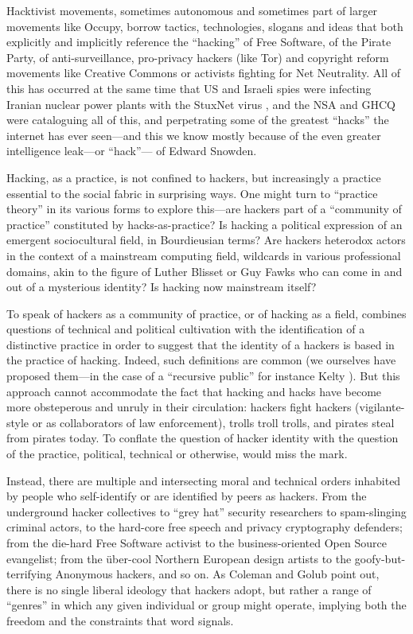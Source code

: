 \documentclass[10pt,letter,oneside]{scrartcl}
\begin{document}
Hacktivist movements, sometimes autonomous and sometimes part of larger
movements like Occupy, borrow tactics, technologies, slogans and ideas that both
explicitly and implicitly reference the ``hacking'' of Free Software, of the
Pirate Party, of anti-surveillance, pro-privacy hackers (like Tor) and copyright
reform movements like Creative Commons or activists fighting for Net
Neutrality. All of this has occurred at the same time that US and Israeli spies
were infecting Iranian nuclear power plants with the StuxNet virus
\parencite{zetter_countdown_2014}, and the NSA and GHCQ were cataloguing all of
this, and perpetrating some of the greatest ``hacks'' the internet has ever
seen---and this we know mostly because of the even greater intelligence
leak---or ``hack''--- of Edward Snowden.

Hacking, as a practice, is not confined to hackers, but increasingly a practice
essential to the social fabric in surprising ways.  One might turn to ``practice
theory'' in its various forms to explore this---are hackers part of a
``community of practice'' constituted by hacks-as-practice?  Is hacking a
political expression of an emergent sociocultural field, in Bourdieusian terms?
Are hackers heterodox actors in the context of a mainstream computing field,
wildcards in various professional domains, akin to the figure of Luther Blisset
or Guy Fawks who can come in and out of a mysterious identity?  Is hacking now
mainstream itself?

To speak of hackers as a community of practice, or of hacking as a field,
combines questions of technical and political cultivation with the
identification of a distinctive practice in order to suggest that the identity
of a hackers is based in the practice of hacking.  Indeed, such definitions are
common (we ourselves have proposed them---in the case of a ``recursive public''
for instance Kelty \cite*{kelty_two_2008}).  But this approach cannot 
accommodate the fact that hacking and hacks have become more obsteperous 
and unruly in their circulation: hackers fight hackers (vigilante-style or
as collaborators of law enforcement), trolls troll trolls, and pirates steal 
from pirates today.  To conflate the question of hacker identity with the 
question of the practice, political, technical or otherwise, would miss the 
mark.

Instead, there are multiple and intersecting moral and technical orders 
inhabited by people who self-identify or are identified by peers as hackers. 
From the underground hacker collectives to ``grey hat'' security researchers 
to spam-slinging criminal actors, to the hard-core free speech and privacy 
cryptography defenders; from the die-hard Free Software activist to the 
business-oriented Open Source evangelist; from the über-cool Northern 
European design artists to the goofy-but-terrifying Anonymous hackers, 
and so on.  As Coleman and Golub \cite*{coleman_hacker_2008} point out, 
there is no single liberal ideology that hackers adopt, but rather a 
range of ``genres'' in which any given individual or group might 
operate, implying both the freedom and the constraints that word signals.
\end{document}
